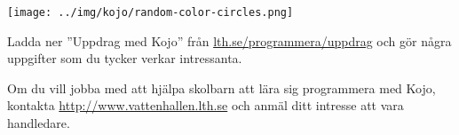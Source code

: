\texttt{[image: ../img/kojo/random-color-circles.png]}


\Task Ladda ner ''Uppdrag med Kojo'' från \href{http://lth.se/programmera/uppdrag}{lth.se/programmera/uppdrag}  och gör några uppgifter som du tycker verkar intressanta.


\Task Om du vill jobba med att hjälpa skolbarn att lära sig programmera med Kojo, kontakta \url{http://www.vattenhallen.lth.se} och anmäl ditt intresse att vara handledare.
